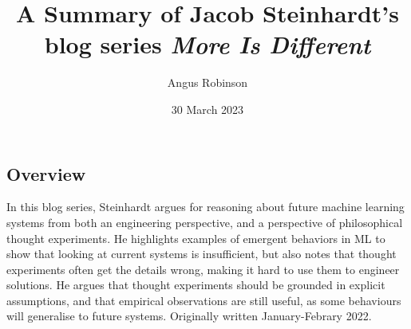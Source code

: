 \documentclass{article}
\title{A Summary of Jacob Steinhardt's blog series \textit{More Is Different}}
\author{Angus Robinson}
\date{30 March 2023}
\begin{document}

\maketitle
\begin{multicols}{2}

\section*{Overview}

In this blog series, Steinhardt argues for reasoning about future machine learning systems from both an engineering perspective, and a perspective of philosophical thought experiments. He highlights examples of emergent behaviors in ML to show that looking at current systems is insufficient, but also notes that thought experiments often get the details wrong, making it hard to use them to engineer solutions. He argues that thought experiments should be grounded in explicit assumptions, and that empirical observations are still useful, as some behaviours will generalise to future systems.
Originally written January-Febrary 2022.


\end{multicols}
\end{document}

